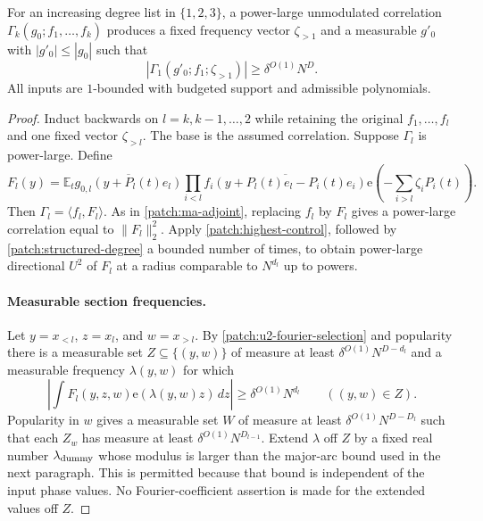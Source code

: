 \documentclass[11pt]{article}
\theoremstyle{definition}
\newcommand{\ee}[1]{\mathrm e\!\left(#1\right)}
\begin{document}
\begin{lemma}\label{patch:remove-high-inputs}
For an increasing degree list in $\{1,2,3\}$, a power-large unmodulated correlation
$\Gamma_k(g_0;f_1,\ldots,f_k)$ produces a fixed frequency vector $\zeta_{>1}$ and a
measurable $g'_0$ with $|g'_0|\leq|g_0|$ such that
\[
 |\Gamma_1(g'_0;f_1;\zeta_{>1})|\geq\delta^{O(1)}N^D.
\]
All inputs are $1$-bounded with budgeted support and admissible polynomials.
\end{lemma}
\begin{proof}
Induct backwards on $l=k,k-1,\ldots,2$ while retaining the original $f_1,\ldots,f_l$ and
one fixed vector $\zeta_{>l}$.  The base is the assumed correlation.
Suppose $\Gamma_l$ is power-large.  Define
\[
 F_l(y)=\mathbb E_t\overline{g_{0,l}(y+P_l(t)e_l)}
          \prod_{i<l}\overline{f_i(y+P_l(t)e_l-P_i(t)e_i)}
                           \ee{-\sum_{i>l}\zeta_iP_i(t)}.
\]
Then $\Gamma_l=\langle f_l,F_l\rangle$.  As in \eqref{patch:ma-adjoint}, replacing $f_l$
by $F_l$ gives a power-large correlation equal to $\|F_l\|_2^2$.
Apply \cref{patch:highest-control}, followed by \cref{patch:structured-degree} a bounded
number of times, to obtain power-large directional $U^2$ of $F_l$ at a radius comparable
to $N^{d_l}$ up to powers.

\paragraph{Measurable section frequencies.}
Let $y=x_{<l}$, $z=x_l$, and $w=x_{>l}$.
By \cref{patch:u2-fourier-selection} and popularity there is a measurable set
$Z\subseteq\{(y,w)\}$ of measure at least $\delta^{O(1)}N^{D-d_l}$ and a measurable
frequency $\lambda(y,w)$ for which
\[
 \label{patch:high-section-coeff}
 \left|\int F_l(y,z,w)\ee{\lambda(y,w)z}\,dz\right|
                                  \geq\delta^{O(1)}N^{d_l}\qquad((y,w)\in Z).
 \tag{\theequation}
\]
Popularity in $w$ gives a measurable set $W$ of measure at least
$\delta^{O(1)}N^{D-D_l}$ such that each $Z_w$ has measure at least
$\delta^{O(1)}N^{D_{l-1}}$.
Extend $\lambda$ off $Z$ by a fixed real number $\lambda_{\rm dummy}$ whose modulus is
larger than the major-arc bound used in the next paragraph.  This is permitted because that
bound is independent of the input phase values.  No Fourier-coefficient assertion is made
for the extended values off $Z$.


\end{proof}
\end{document}
